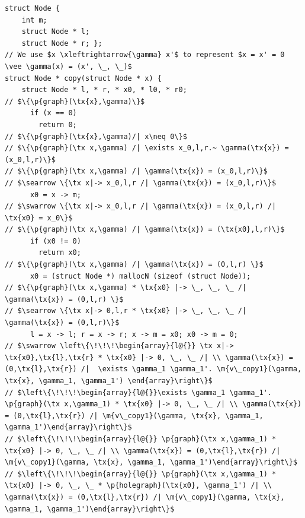 \documentclass[acmsmall,screen]{acmart}  %
\newcommand{\tx}[1]{\text{#1}}
\newcommand{\p}[1]{\ensuremath{\mathsf{#1}}} \newcommand{\m}[1]{\ensuremath{\mathit{#1}}} \newcommand{\ma}[1]{\ensuremath{\mathcal{#1}}} \let\ramify\lightning
\begin{document}
\begin{lstlisting}
struct Node {
    int m;
    struct Node * l;
    struct Node * r; };
// We use $x \xleftrightarrow{\gamma} x'$ to represent $x = x' = 0 \vee \gamma(x) = (x', \_, \_)$
struct Node * copy(struct Node * x) { 
    struct Node * l, * r, * x0, * l0, * r0;
// $\{\p{graph}(\tx{x},\gamma)\}$
      if (x == 0)
        return 0;
// $\{\p{graph}(\tx{x},\gamma)/| x\neq 0\}$
// $\{\p{graph}(\tx x,\gamma) /| \exists x_0,l,r.~ \gamma(\tx{x}) = (x_0,l,r)\}$
// $\{\p{graph}(\tx x,\gamma) /| \gamma(\tx{x}) = (x_0,l,r)\}$
// $\searrow \{\tx x|-> x_0,l,r /| \gamma(\tx{x}) = (x_0,l,r)\}$
      x0 = x -> m;
// $\swarrow \{\tx x|-> x_0,l,r /| \gamma(\tx{x}) = (x_0,l,r) /| \tx{x0} = x_0\}$
// $\{\p{graph}(\tx x,\gamma) /| \gamma(\tx{x}) = (\tx{x0},l,r)\}$
      if (x0 != 0)
        return x0;
// $\{\p{graph}(\tx x,\gamma) /| \gamma(\tx{x}) = (0,l,r) \}$
      x0 = (struct Node *) mallocN (sizeof (struct Node));
// $\{\p{graph}(\tx x,\gamma) * \tx{x0} |-> \_, \_, \_ /| \gamma(\tx{x}) = (0,l,r) \}$
// $\searrow \{\tx x|-> 0,l,r * \tx{x0} |-> \_, \_, \_ /| \gamma(\tx{x}) = (0,l,r)\}$
      l = x -> l; r = x -> r; x -> m = x0; x0 -> m = 0;
// $\swarrow \left\{\!\!\!\begin{array}{l@{}} \tx x|-> \tx{x0},\tx{l},\tx{r} * \tx{x0} |-> 0, \_, \_ /| \\ \gamma(\tx{x}) = (0,\tx{l},\tx{r}) /|  \exists \gamma_1 \gamma_1'. \m{v\_copy1}(\gamma, \tx{x}, \gamma_1, \gamma_1') \end{array}\right\}$
// $\left\{\!\!\!\begin{array}{l@{}}\exists \gamma_1 \gamma_1'. \p{graph}(\tx x,\gamma_1) * \tx{x0} |-> 0, \_, \_ /| \\ \gamma(\tx{x}) = (0,\tx{l},\tx{r}) /| \m{v\_copy1}(\gamma, \tx{x}, \gamma_1, \gamma_1')\end{array}\right\}$
// $\left\{\!\!\!\begin{array}{l@{}} \p{graph}(\tx x,\gamma_1) * \tx{x0} |-> 0, \_, \_ /| \\ \gamma(\tx{x}) = (0,\tx{l},\tx{r}) /| \m{v\_copy1}(\gamma, \tx{x}, \gamma_1, \gamma_1')\end{array}\right\}$
// $\left\{\!\!\!\begin{array}{l@{}} \p{graph}(\tx x,\gamma_1) * \tx{x0} |-> 0, \_, \_ * \p{holegraph}(\tx{x0}, \gamma_1') /| \\ \gamma(\tx{x}) = (0,\tx{l},\tx{r}) /| \m{v\_copy1}(\gamma, \tx{x}, \gamma_1, \gamma_1')\end{array}\right\}$

\end{lstlisting}
\end{document}
